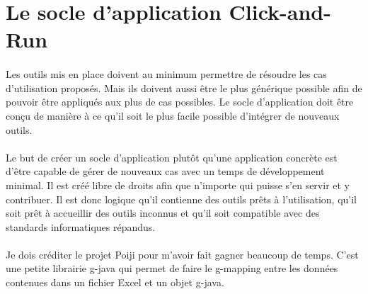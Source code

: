 \section{Le socle d'application Click-and-Run}
\label{sec:spreadsheet-framework}

\paragraph{}
Les outils mis en place doivent au minimum permettre de résoudre les cas d'utilisation proposés.
Mais ils doivent aussi être le plus générique possible afin de pouvoir être appliqués aux plus de cas possibles.
Le socle d'application doit être conçu de manière à ce qu'il soit le plus facile possible d'intégrer de nouveaux outils.

\paragraph{}
Le but de créer un socle d'application plutôt qu'une application concrète est d'être capable de gérer de nouveaux cas avec un temps de développement minimal.
Il est créé libre de droits afin que n'importe qui puisse s'en servir et y contribuer.
Il est donc logique qu'il contienne des outils prêts à l'utilisation, qu'il soit prêt à accueillir des outils inconnus et qu'il soit compatible avec des standards informatiques répandus.

\paragraph{}
Je dois créditer le projet Poiji pour m'avoir fait gagner beaucoup de temps.
C'est une petite librairie \Gls{g-java} qui permet de faire le \gls{g-mapping} entre les données contenues dans un fichier Excel et un objet \Gls{g-java}\cite{ozler_:candy:_2019}.






